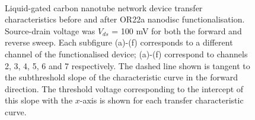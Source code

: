 \documentclass[
  a4paper,
]{scrbook}
\begin{document}
\begin{figure}
\begin{minipage}[t]{0.45\linewidth}
{{}

}

\end{minipage}%
%
\begin{minipage}[t]{0.01\linewidth}

{\centering 

~

}

\end{minipage}%

\caption[Carbon nanotube network device transfer characteristics before
and after unsuccessful OR22a nanodisc
functionalisation.]{\label{fig-OR22a-variability-TX}Liquid-gated carbon
nanotube network device transfer characteristics before and after OR22a
nanodisc functionalisation. Source-drain voltage was \(V_{ds}\) = 100 mV
for both the forward and reverse sweep. Each subfigure (a)-(f)
corresponds to a different channel of the functionalised device; (a)-(f)
correspond to channels 2, 3, 4, 5, 6 and 7 respectively. The dashed line
shown is tangent to the subthreshold slope of the characteristic curve
in the forward direction. The threshold voltage corresponding to the
intercept of this slope with the \(x\)-axis is shown for each transfer
characteristic curve.}

\end{figure}
\end{document}
